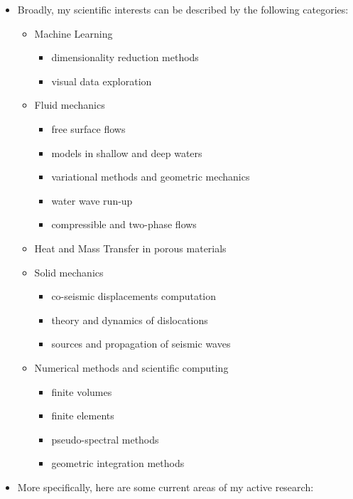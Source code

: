 \documentclass[final, a4paper, oneside, 12pt]{article}
\numberwithin{equation}{section}
\begin{document}
\begin{itemize}
  \item Broadly, my scientific interests can be described by the following categories:

  \begin{itemize}
    \item Machine Learning
    \begin{itemize}
      \item dimensionality reduction methods
      \item visual data exploration 
    \end{itemize}
	  \item Fluid mechanics
	  \begin{itemize}
	    \item free surface flows
	    \item models in shallow and deep waters
	    \item variational methods and geometric mechanics
	    \item water wave run-up
	    \item compressible and two-phase flows
	  \end{itemize}
	  \item Heat and Mass Transfer in porous materials
	  \item Solid mechanics
	  \begin{itemize}
	    \item co-seismic displacements computation
	    \item theory and dynamics of dislocations
	    \item sources and propagation of seismic waves
	  \end{itemize}
	  \item Numerical methods and scientific computing
	  \begin{itemize}
	    \item finite volumes
	    \item finite elements
	    \item pseudo-spectral methods
	    \item geometric integration methods
	  \end{itemize}
	\end{itemize}
		
  \item More specifically, here are some current areas of my active research:

  \begin{description}
  

\end{description}
\end{itemize}
\end{document}
